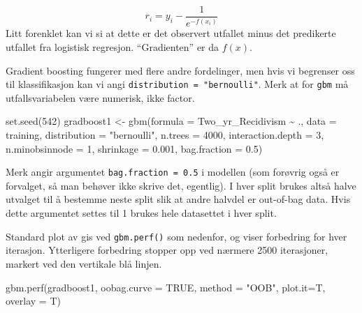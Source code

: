 \documentclass[
  letterpaper,
  DIV=11,
  numbers=noendperiod]{scrreprt}
\newenvironment{Shaded}{\begin{snugshade}}{\end{snugshade}}
\newcommand{\AttributeTok}[1]{\textcolor[rgb]{0.40,0.45,0.13}{#1}}
\newcommand{\ConstantTok}[1]{\textcolor[rgb]{0.56,0.35,0.01}{#1}}
\newcommand{\DecValTok}[1]{\textcolor[rgb]{0.68,0.00,0.00}{#1}}
\newcommand{\FloatTok}[1]{\textcolor[rgb]{0.68,0.00,0.00}{#1}}
\newcommand{\FunctionTok}[1]{\textcolor[rgb]{0.28,0.35,0.67}{#1}}
\newcommand{\NormalTok}[1]{\textcolor[rgb]{0.00,0.23,0.31}{#1}}
\newcommand{\OtherTok}[1]{\textcolor[rgb]{0.00,0.23,0.31}{#1}}
\newcommand{\SpecialCharTok}[1]{\textcolor[rgb]{0.37,0.37,0.37}{#1}}
\newcommand{\StringTok}[1]{\textcolor[rgb]{0.13,0.47,0.30}{#1}}
\begin{document}
\[ r_i = y_i - \frac{1}{e^{-f(x_i)}} \] Litt forenklet kan vi si at
dette er det observert utfallet minus det predikerte utfallet fra
logistisk regresjon. ``Gradienten'' er da \(f(x)\).

Gradient boosting fungerer med flere andre fordelinger, men hvis vi
begrenser oss til klassifikasjon kan vi angi
\texttt{distribution\ =\ "bernoulli"}. Merk at for \texttt{gbm} må
utfallsvariabelen være numerisk, ikke factor.

\begin{Shaded}
\begin{Highlighting}[]
\FunctionTok{set.seed}\NormalTok{(}\DecValTok{542}\NormalTok{)}
\NormalTok{gradboost1 }\OtherTok{\textless{}{-}} \FunctionTok{gbm}\NormalTok{(}\AttributeTok{formula =}\NormalTok{ Two\_yr\_Recidivism }\SpecialCharTok{\textasciitilde{}}\NormalTok{ .,}
                 \AttributeTok{data =}\NormalTok{ training,}
                 \AttributeTok{distribution =} \StringTok{"bernoulli"}\NormalTok{,}
                 \AttributeTok{n.trees =} \DecValTok{4000}\NormalTok{,}
                 \AttributeTok{interaction.depth =} \DecValTok{3}\NormalTok{,}
                 \AttributeTok{n.minobsinnode =} \DecValTok{1}\NormalTok{,}
                 \AttributeTok{shrinkage =} \FloatTok{0.001}\NormalTok{,}
                 \AttributeTok{bag.fraction =} \FloatTok{0.5}\NormalTok{)}
\end{Highlighting}
\end{Shaded}

Merk angir argumentet \texttt{bag.fraction\ =\ 0.5} i modellen (som
forøvrig også er forvalget, så man behøver ikke skrive det, egentlig). I
hver split brukes altså halve utvalget til å bestemme neste split slik
at andre halvdel er out-of-bag data. Hvis dette argumentet settes til 1
brukes hele datasettet i hver split.

Standard plot av gis ved \texttt{gbm.perf()} som nedenfor, og viser
forbedring for hver iterasjon. Ytterligere forbedring stopper opp ved
nærmere 2500 iterasjoner, markert ved den vertikale blå linjen.

\begin{Shaded}
\begin{Highlighting}[]
\FunctionTok{gbm.perf}\NormalTok{(gradboost1, }\AttributeTok{oobag.curve =} \ConstantTok{TRUE}\NormalTok{, }\AttributeTok{method =} \StringTok{"OOB"}\NormalTok{, }
            \AttributeTok{plot.it=}\NormalTok{T, }\AttributeTok{overlay =}\NormalTok{ T) }
\end{Highlighting}
\end{Shaded}
\end{document}
